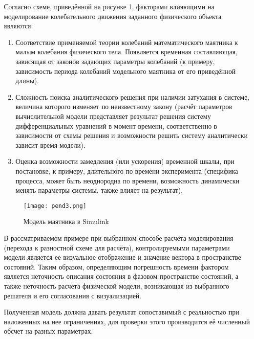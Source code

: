 {\begin{onehalfspace}
Согласно схеме, приведённой на рисунке 1, факторами влияющими на моделирование колебательного движения заданного физического объекта являются:
	
	\begin{enumerate} 	
	\item Соответствие применяемой теории колебаний математического маятника к малым колебания физического тела. Появляется временная составляющая, зависящая от законов задающих параметры колебаний (к примеру, зависимость периода колебаний модельного маятника от его приведённой длины).
		
	\item Сложность поиска аналитического решения при наличии затухания в системе, величина которого изменяет по неизвестному закону (расчёт параметров вычислительной модели представляет результат решения систему дифференциальных уравнений в момент времени, соответственно в зависимости от схемы решения и возможности решить систему аналитически зависит время модели).
	
	\item  Оценка возможности замедления (или ускорения)
	временной шкалы, при постановке, к примеру, длительного по времени эксперимента (специфика процесса, может быть неоднородна по времени, возможность динамически менять параметры системы, также влияет на результат). 
	\end{enumerate} 

 \begin{center}
		\begin{figure}[h]
			\centering
			\texttt{[image: pend3.png]}
			\caption{Модель маятника в Simulink}
			\label{fig:model4}
		\end{figure}
	\end{center}

	

		
	В рассматриваемом примере при выбранном способе расчёта моделирования (перехода к разностной схеме для расчёта), контролируемыми параметрами модели является ее визуальное отображение и значение вектора в пространстве состояний. Таким образом, определяющим погрешность времени фактором является неточность описания состояния в фазовом пространстве состояний, а также неточность расчета физической модели, возникающая из выбранного решателя и его согласования с визуализацией.

	Полученная модель должна давать результат сопоставимый с реальностью при наложенных на нее ограничениях, для проверки этого производится её численный обсчет на разных параметрах. 
	
	

 
\end{onehalfspace}}

